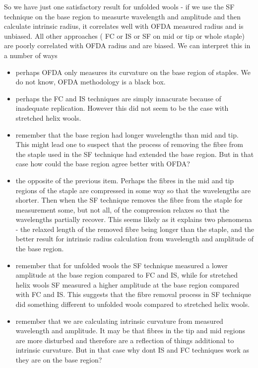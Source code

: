 \documentclass[titlepage,10pt]{article}  %
\begin{document}
 So we have just one satisfactory result for unfolded wools - if we use the SF technique on the base region to measurte wavelength and amplitude and then calculate intrinsic radius, it correlates well with OFDA measured radius and is unbiased.  All other approaches ( FC or IS or SF on mid or tip or whole staple) are poorly correlated with OFDA radius and are biased. We can interpret this in a number of ways
\begin{itemize}
\item perhaps OFDA only measures its curvature on the base region of staples. We do not know, OFDA methodology is a black box.
\item perhaps the FC and IS techniques are simply innacurate because of inadequate replication. However this did not seem to be the case with stretched helix wools.
\item remember that the base region had longer wavelengths than mid and tip. This might lead one to suspect that the process of removing the fibre from the staple used in the SF technique had extended the base region. But in that case how could the base region agree better with OFDA?
\item the opposite of the previous item. Perhaps the fibres in the mid and tip regions of the staple are compressed in some way so that the wavelengths are shorter. Then when the SF technique removes the fibre from the staple for measurement some, but not all, of the compression relaxes so that the wavelengths partially recover. This seems likely as it explains two phenomena - the relaxed length of the removed fibre being longer than the staple, and the better result for intrinsic radius calculation from wavelength and amplitude of the base region. 
\item remember that for unfolded wools the SF technique measured a lower amplitude at the base region compared to FC and IS, while for stretched helix wools SF measured a higher amplitude at the base region compared with FC and IS. This suggests that the fibre removal process in SF technique did something different to unfolded wools compared to stretched helix wools. 
\item remember that we are calculating intrinsic curvature from measured wavelength and amplitude. It may be that fibres in the tip and mid regions are more disturbed and therefore are a reflection of things additional to intrinsic curvature. But in that case why dont IS and FC techniques work as they are on the base region?
\end{itemize}
\end{document}
